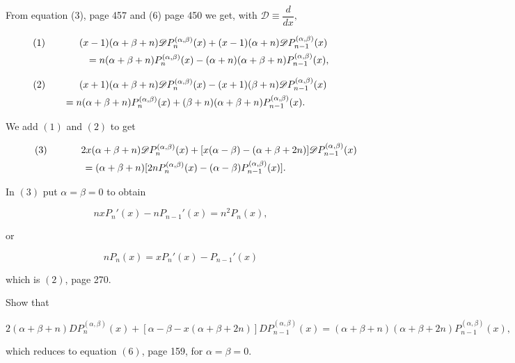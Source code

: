 \begin{solution}
From equation (3), page 457 and (6) page 450 we get, with $\mathscr{D} \equiv \dfrac{d}{dx},$

\begin{eqnarray*}
(1) \hspace{35pt} \lefteqn{(x-1)(\alpha+\beta+n)\mathscr{D}P_n^{(\alpha,\beta)}(x) + (x-1)(\alpha+n) \mathscr{D} P_{n-1}^{(\alpha,\beta)}(x)} \\
&& = n(\alpha+\beta+n)P_n^{(\alpha,\beta)}(x) - (\alpha+n)(\alpha+\beta+n) P_{n-1}^{(\alpha,\beta)}(x),
\end{eqnarray*}

\begin{eqnarray*}
\lefteqn{\hspace{-24pt} (2) \hspace{35pt} (x+1)(\alpha+\beta+n)\mathscr{D}P_n^{(\alpha,\beta)}(x) - (x+1)(\beta+n) \mathscr{D}P_{n-1}^{(\alpha,\beta)}(x)} \\
&& = n(\alpha+\beta+n)P_n^{(\alpha,\beta)}(x) + (\beta+n)(\alpha+\beta+n) P_{n-1}^{(\alpha,\beta)}(x).
\end{eqnarray*}

We add $(1)$ and $(2)$ to get

\begin{eqnarray*}
\lefteqn{\hspace{-42pt} (3) \hspace{35pt} 2x(\alpha+\beta+n)\mathscr{D}P_n^{(\alpha,\beta)}(x) + [x(\alpha-\beta)-(\alpha+\beta+2n)]\mathscr{D} P_{n-1}^{(\alpha,\beta)}(x)} \\
&& = (\alpha+\beta+n) [2n P_n^{(\alpha,\beta)}(x) - (\alpha-\beta)P_{n-1}^{(\alpha,\beta)}(x)].
\end{eqnarray*}

In $(3)$ put $\alpha=\beta=0$ to obtain

$$nxP_n'(x) - nP_{n-1}'(x) = n^2P_n(x),$$

or

$$nP_n(x) = xP_n'(x) - P_{n-1}'(x)$$

which is $(2)$, page 270.
\end{solution}
\begin{problem}\label{problem3chapter16}
Show that

$$2(\alpha+\beta+n)DP_n^{(\alpha,\beta)}(x) + [\alpha-\beta-x(\alpha+\beta+2n)]D P_{n-1}^{(\alpha,\beta)}(x) = (\alpha+\beta+n)(\alpha+\beta+2n)P_{n-1}^{(\alpha,\beta)}(x),$$

which reduces to equation $(6)$, page 159, for $\alpha=\beta=0$.
\end{problem}
